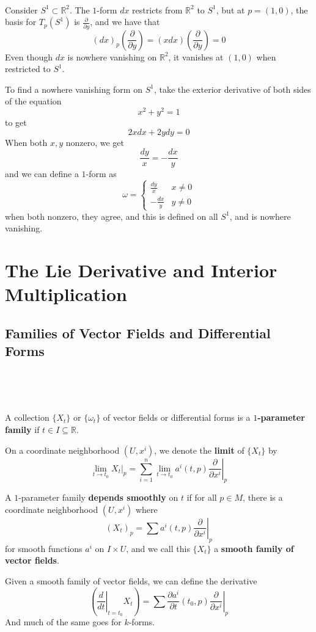 \documentclass{article}
\begin{document}
\begin{example}
  \

  Consider $S^1\subset \mathbb{R}^2$. The $1$-form $dx$ restricts from $\mathbb{R}^2$ to $S^1$, but at $p = (1,0)$, the basis for $T_p(S^1)$ is $\frac{\partial}{\partial y}$, and we have that $$(dx)_p(\frac{\partial}{\partial y}) = (x dx)(\frac{\partial}{\partial y}) = 0$$Even though $dx$ is nowhere vanishing on $\mathbb{R}^2$, it vanishes at $(1,0)$ when restricted to $S^1$.

  To find a nowhere vanishing form on $S^1$, take the exterior derivative of both sides of the equation $$x^2 + y^2 = 1$$to get $$2xdx + 2ydy = 0$$When both $x,y$ nonzero, we get $$\frac{dy}{x} = -\frac{dx}{y}$$and we can define a $1$-form as $$\omega =
  \begin{cases}
    \frac{dy}{x} & x \neq 0\\
    -\frac{dx}{y} & y \neq 0
  \end{cases}$$when both nonzero, they agree, and this is defined on all $S^1$, and is nowhere vanishing.
\end{example}

\section{The Lie Derivative and Interior Multiplication}

\subsection{Families of Vector Fields and Differential Forms}
\

\begin{definition}
  \

  A collection $\{X_t\}$ or $\{\omega_t\}$ of vector fields or differential forms is a \textbf{$1$-parameter family} if $t \in I \subseteq \mathbb{R}$.

  On a coordinate neighborhood $(U, x^i)$, we denote the \textbf{limit} of $\{X_t\}$ by $$\lim_{t \to t_0} X_t \vert_p = \sum_{i=1}^n \lim_{t \to t_0}a^i(t,p) \left.\frac{\partial}{\partial x^i}\right\vert_p$$

  A $1$-parameter family \textbf{depends smoothly} on $t$ if for all $p \in M$, there is a coordinate neighborhood $(U, x^i)$ where $$(X_t)_p = \sum a^i(t,p) \left.\frac{\partial}{\partial x^i}\right\vert_p$$for smooth functions $a^i$ on $I \times U$, and we call this $\{X_t\}$ a \textbf{smooth family of vector fields}.

  Given a smooth family of vector fields, we can define the derivative $$(\left.\frac{d}{dt}\right\vert_{t=t_0} X_t) = \sum \frac{\partial a^i}{\partial t}(t_0,p) \left.\frac{\partial}{\partial x^i}\right\vert_p$$And much of the same goes for $k$-forms.
\end{definition}
\end{document}
